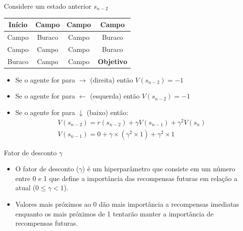 \documentclass{beamer}
\begin{document}
\begin{frame}{Considere um estado anterior $s_{n-2}$}
	
	\begin{center}
		\begin{tabular}{ |c|c|c|c| } 
			\hline
			Início & Campo & Campo & Campo \\ 
			\hline
			Campo & \cellcolor{black!25} Buraco & \cellcolor{red!25} Campo &  \cellcolor{black!25} Buraco\\ 
			\hline
			Campo & Campo & Campo & \cellcolor{black!25} Buraco\\ 
			\hline
			\cellcolor{black!25} Buraco & Campo & Campo & \textbf{Objetivo} \\ 
			\hline
		\end{tabular}
	\end{center}
	
	\vspace{0.2cm}
	
	\begin{itemize}
		\item Se o agente for para $\rightarrow$ (direita) então $V(s_{n-2}) = -1$
		\item Se o agente for para $\leftarrow$ (esquerda) então $V(s_{n-2}) = -1$
		\item Se o agente for para $\downarrow$ (baixo) então:
		\begin{eqnarray}
			V(s_{n-2}) = r(s_{n-2}) + \gamma V(s_{n-1}) + \gamma^{2} V(s_{n}) \\ \nonumber
			V(s_{n-1}) = 0 + \gamma \times (\gamma^{2} \times 1) + \gamma^{2} \times 1 \nonumber
		\end{eqnarray}
	\end{itemize}
	
\end{frame}


\begin{frame}{Fator de desconto $\gamma$}
	
	\begin{itemize}
		\item O fator de desconto ($\gamma$) é um hiperparâmetro que consiste 
		em um número entre 0 e 1 que define a importância das recompensas futuras 
		em relação a atual	($0 \leq \gamma < 1$).
		\item Valores mais próximos ao 0 dão mais importância a recompensas 
		imediatas enquanto os mais próximos de 1 tentarão manter a importância 
		de recompensas futuras.
	\end{itemize}
\end{frame}
\end{document}
